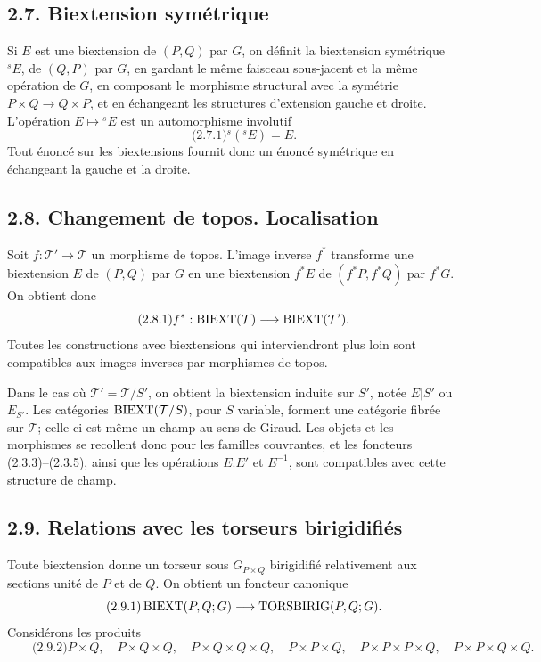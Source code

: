 \documentclass[11pt]{article}
\begin{document}
\subsection*{2.7. Biextension symétrique}
Si \(E\) est une biextension de \((P,Q)\) par \(G\), on définit la biextension symétrique \({}^sE\), de \((Q,P)\) par \(G\), en gardant le même faisceau sous-jacent et la même opération de \(G\), en composant le morphisme structural avec la symétrie \(P\times Q\to Q\times P\), et en échangeant les structures d'extension gauche et droite.  L'opération \(E\mapsto{}^sE\) est un automorphisme involutif
\begin{equation}\qquad\text{(2.7.1)}
  {}^s({}^sE)=E.
\end{equation}
Tout énoncé sur les biextensions fournit donc un énoncé symétrique en échangeant la gauche et la droite.

\subsection*{2.8. Changement de topos. Localisation}
Soit \(f:\mathcal T'\to\mathcal T\) un morphisme de topos.  L'image inverse \(f^*\) transforme une biextension \(E\) de \((P,Q)\) par \(G\) en une biextension \(f^*E\) de \((f^*P,f^*Q)\) par \(f^*G\).  On obtient donc
\begin{equation}\qquad\text{(2.8.1)}
  f^*:\operatorname{BIEXT}(\mathcal T)\longrightarrow\operatorname{BIEXT}(\mathcal T').
\end{equation}
Toutes les constructions avec biextensions qui interviendront plus loin sont compatibles aux images inverses par morphismes de topos.

Dans le cas où \(\mathcal T'=\mathcal T/S'\), on obtient la biextension induite sur \(S'\), notée \(E|S'\) ou \(E_{S'}\).  Les catégories \(\operatorname{BIEXT}(\mathcal T/S)\), pour \(S\) variable, forment une catégorie fibrée sur \(\mathcal T\); celle-ci est même un champ au sens de Giraud.  Les objets et les morphismes se recollent donc pour les familles couvrantes, et les foncteurs (2.3.3)--(2.3.5), ainsi que les opérations \(E.E'\) et \(E^{-1}\), sont compatibles avec cette structure de champ.

\subsection*{2.9. Relations avec les torseurs birigidifiés}
Toute biextension donne un torseur sous \(G_{P\times Q}\) birigidifié relativement aux sections unité de \(P\) et de \(Q\).  On obtient un foncteur canonique
\begin{equation}\qquad\text{(2.9.1)}
  \operatorname{BIEXT}(P,Q;G)\longrightarrow\operatorname{TORSBIRIG}(P,Q;G).
\end{equation}
Considérons les produits
\begin{equation}\qquad\text{(2.9.2)}
  P\times Q,
  \quad P\times Q\times Q,
  \quad P\times Q\times Q\times Q,
  \quad P\times P\times Q,
  \quad P\times P\times P\times Q,
  \quad P\times P\times Q\times Q.
\end{equation}
\end{document}

